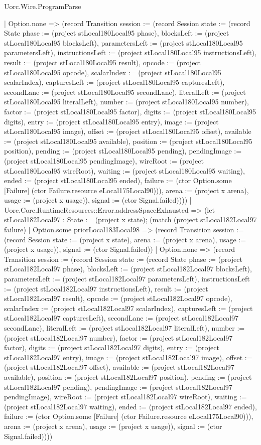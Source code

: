 \begin{lexlean}{Uorc.Wire.ProgramParse}
\begin{semanticmodule}
{        | Option.none => (record Transition {session := (record Session {state := (record State {phase := (project stLocal180Local95 phase), blocksLeft := (project stLocal180Local95 blocksLeft), parametersLeft := (project stLocal180Local95 parametersLeft), instructionsLeft := (project stLocal180Local95 instructionsLeft), result := (project stLocal180Local95 result), opcode := (project stLocal180Local95 opcode), scalarIndex := (project stLocal180Local95 scalarIndex), capturesLeft := (project stLocal180Local95 capturesLeft), secondLane := (project stLocal180Local95 secondLane), literalLeft := (project stLocal180Local95 literalLeft), number := (project stLocal180Local95 number), factor := (project stLocal180Local95 factor), digits := (project stLocal180Local95 digits), entry := (project stLocal180Local95 entry), image := (project stLocal180Local95 image), offset := (project stLocal180Local95 offset), available := (project stLocal180Local95 available), position := (project stLocal180Local95 position), pending := (project stLocal180Local95 pending), pendingImage := (project stLocal180Local95 pendingImage), wireRoot := (project stLocal180Local95 wireRoot), waiting := (project stLocal180Local95 waiting), ended := (project stLocal180Local95 ended), failure := (ctor Option.some [Failure] (ctor Failure.resource eLocal175Local90))}), arena := (project x arena), usage := (project x usage)}), signal := (ctor Signal.failed)})))
      | Uorc.Core.RuntimeResources::Error.addressSpaceExhausted => (let stLocal182Local97 : State := (project x state); (match (project stLocal182Local97 failure)
        | Option.some priorLocal183Local98 => (record Transition {session := (record Session {state := (project x state), arena := (project x arena), usage := (project x usage)}), signal := (ctor Signal.failed)})
        | Option.none => (record Transition {session := (record Session {state := (record State {phase := (project stLocal182Local97 phase), blocksLeft := (project stLocal182Local97 blocksLeft), parametersLeft := (project stLocal182Local97 parametersLeft), instructionsLeft := (project stLocal182Local97 instructionsLeft), result := (project stLocal182Local97 result), opcode := (project stLocal182Local97 opcode), scalarIndex := (project stLocal182Local97 scalarIndex), capturesLeft := (project stLocal182Local97 capturesLeft), secondLane := (project stLocal182Local97 secondLane), literalLeft := (project stLocal182Local97 literalLeft), number := (project stLocal182Local97 number), factor := (project stLocal182Local97 factor), digits := (project stLocal182Local97 digits), entry := (project stLocal182Local97 entry), image := (project stLocal182Local97 image), offset := (project stLocal182Local97 offset), available := (project stLocal182Local97 available), position := (project stLocal182Local97 position), pending := (project stLocal182Local97 pending), pendingImage := (project stLocal182Local97 pendingImage), wireRoot := (project stLocal182Local97 wireRoot), waiting := (project stLocal182Local97 waiting), ended := (project stLocal182Local97 ended), failure := (ctor Option.some [Failure] (ctor Failure.resource eLocal175Local90))}), arena := (project x arena), usage := (project x usage)}), signal := (ctor Signal.failed)})))
}
\end{semanticmodule}
\end{lexlean}
